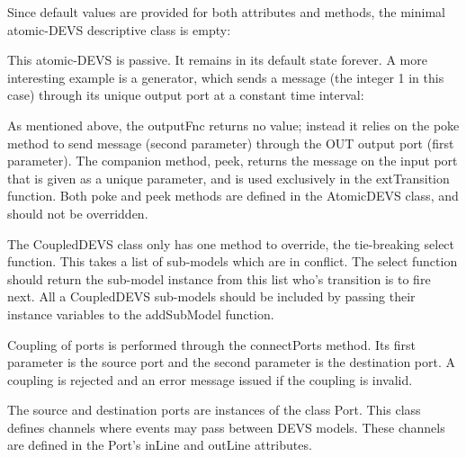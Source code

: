 Since default values are provided for both attributes and methods, the minimal atomic-DEVS descriptive class is empty:


This atomic-DEVS is passive. It remains in its default state forever. A more interesting example is a generator, which sends a message 
(the integer 1 in this case) through its unique output port at a constant time interval:


As mentioned above, the outputFnc returns no value; instead it relies on the poke method to send message (second parameter) through the 
OUT output port (first parameter). The companion method, peek, returns the message on the input port that is given as a unique parameter, 
and is used exclusively in the extTransition function. Both poke and peek methods are defined in the AtomicDEVS class, and should not be 
overridden.

The CoupledDEVS class only has one method to override, the tie-breaking select function. This takes a list of sub-models which are in 
conflict. The select function should return the sub-model instance from this list who's transition is to fire next. All a CoupledDEVS 
sub-models should be included by passing their instance variables to the addSubModel function.

Coupling of ports is performed through the connectPorts method. Its first parameter is the source port and the second parameter is the 
destination port. A coupling is rejected and an error message issued if the coupling is invalid.

The source and destination ports are instances of the class Port. This class defines channels where events may pass between DEVS models. 
These channels are defined in the Port's inLine and outLine attributes.